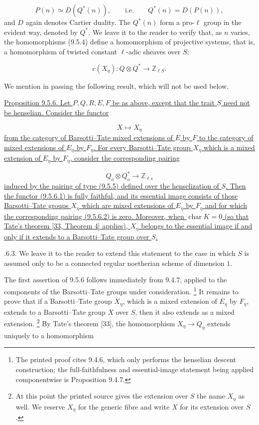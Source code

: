 \begin{equation*}
P(n)\simeq D(Q^*(n)),
\qquad\text{i.e.}\qquad Q^*(n)=D(P(n)),
\end{equation*}
and $D$ again denotes Cartier duality. The $Q^*(n)$ form a pro-$\ell$ group
in the evident way, denoted by $Q^*$. We leave it to the reader to verify
that, as $n$ varies, the homomorphisms (9.5.4) define a homomorphism of
projective systems, that is, a homomorphism of twisted constant
$\ell$-adic sheaves over $S$:

\begin{equation}\tag{9.5.5}
c(X_\eta):Q\otimes Q^*\longrightarrow\mathbb Z_{\ell S}.
\end{equation}

We mention in passing the following result, which will not be used below.

\medskip
\noindent
\underline{Proposition 9.5.6. Let $P,Q,R,E,F$ be as above, except that the
trait $S$ need not be henselian. Consider the functor}

\begin{equation}\tag{9.5.6.1}
X\longmapsto X_\eta
\end{equation}
\underline{from the category of Barsotti--Tate mixed extensions of $E$ by
$F$ to the category of mixed extensions of $E_\eta$ by $F_\eta$. For every
Barsotti--Tate group $X_\eta$ which is a mixed extension of $E_\eta$ by
$F_\eta$, consider the corresponding pairing}

\begin{equation}\tag{9.5.6.2}
Q_o\otimes Q_o^*\longrightarrow\mathbb Z_{\ell s}
\end{equation}
\underline{induced by the pairing of type (9.5.5) defined over the
henselization of $S$. Then the functor (9.5.6.1) is fully faithful, and its
essential image consists of those Barsotti--Tate groups $X_\eta$ which are
mixed extensions of $E_\eta$ by $F_\eta$ and for which the corresponding
pairing (9.5.6.2) is zero. Moreover, when $\operatorname{char}K=0$ (so that
Tate's theorem [33, Theorem 4] applies), $X_\eta$ belongs to the essential
image if and only if it extends to a Barsotti--Tate group over $S$.}

\medskip
{}.6.3. We leave it to the reader to extend this statement to the case in
which $S$ is assumed only to be a connected regular noetherian scheme of
dimension $1$.

The first assertion of 9.5.6 follows immediately from 9.4.7, applied to the
components of the Barsotti--Tate groups under consideration.
\footnote{The printed proof cites 9.4.6, which only performs the henselian
descent construction; the full-faithfulness and essential-image statement
being applied componentwise is Proposition 9.4.7.}
It remains to prove that if a Barsotti--Tate group $X_\eta$, which is a
mixed extension of $E_\eta$ by $F_\eta$, extends to a Barsotti--Tate group
$X$ over $S$, then it also extends as a mixed extension.
\footnote{At this point the printed source gives the extension over $S$ the
name $X_\eta$ as well. We reserve $X_\eta$ for the generic fibre and write
$X$ for its extension over $S$.}
By Tate's theorem [33], the homomorphism
$X_\eta\longrightarrow Q_\eta$ extends uniquely to a homomorphism

